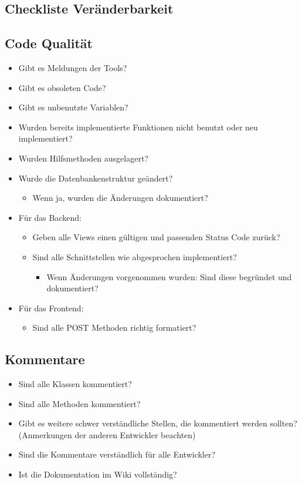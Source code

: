 \subsection{Checkliste Veränderbarkeit}
\begin{multicols}{2}
	\renewcommand{\labelitemi}{\scriptsize$\square$}	\renewcommand{\labelitemii}{\scriptsize$\square$}
	\renewcommand{\labelitemiii}{\scriptsize$\square$}
	\subsection{Code Qualität}
	\begin{itemize}

		\item Gibt es Meldungen der Tools?
		\item Gibt es obsoleten Code?
		\item Gibt es unbenutzte Variablen?
		\item Wurden bereits implementierte Funktionen nicht benutzt oder neu implementiert?
		\item Wurden Hilfsmethoden ausgelagert?

		\item Wurde die Datenbankenstruktur geändert?
		\begin{itemize}
			\item Wenn ja, wurden die Änderungen dokumentiert?
		\end{itemize}
		\item Für das Backend:
		\begin{itemize}
			\item Geben alle Views einen gültigen und passenden Status Code zurück?
			\item Sind alle Schnittstellen wie abgesprochen implementiert?
		\begin{itemize}
			\item Wenn Änderungen vorgenommen wurden: Sind diese begründet und dokumentiert?
		\end{itemize}
		\end{itemize}
		\item Für das Frontend:
		\begin{itemize}
			\item Sind alle POST Methoden richtig formatiert?
		\end{itemize}
	\end{itemize}
	\subsection{Kommentare}
	\begin{itemize}
		\item Sind alle Klassen kommentiert?
		\item Sind alle Methoden kommentiert?
		\item Gibt es weitere schwer verständliche Stellen, die kommentiert werden sollten? (Anmerkungen der anderen Entwickler beachten)
		\item Sind die Kommentare verständlich für alle Entwickler?
		\item Ist die Dokumentation im Wiki vollständig?
	\end{itemize}


\end{multicols}
